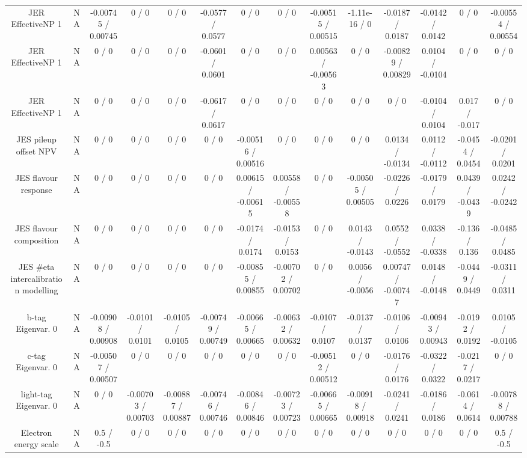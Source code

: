 \documentclass[10pt]{article}
\begin{document}
\begin{table}[htbp]
\begin{center}
\begin{tabular}{|c|c|c|c|c|c|c|c|c|c|c|c|c|c|}
  JER EffectiveNP 1 &    NA    & -0.00745 / 0.00745 & 0 / 0 & 0 / 0 & -0.0577 / 0.0577 & 0 / 0 & 0 / 0 & -0.00515 / 0.00515 & -1.11e-16 / 0 & -0.0187 / 0.0187 & -0.0142 / 0.0142 & 0 / 0 & -0.00554 / 0.00554 \\ 
  JER EffectiveNP 1 &    NA    & 0 / 0 & 0 / 0 & 0 / 0 & -0.0601 / 0.0601 & 0 / 0 & 0 / 0 & 0.00563 / -0.00563 & 0 / 0 & -0.00829 / 0.00829 & 0.0104 / -0.0104 & 0 / 0 & 0 / 0 \\ 
  JER EffectiveNP 1 &    NA    & 0 / 0 & 0 / 0 & 0 / 0 & -0.0617 / 0.0617 & 0 / 0 & 0 / 0 & 0 / 0 & 0 / 0 & 0 / 0 & -0.0104 / 0.0104 & 0.017 / -0.017 & 0 / 0 \\ 
  JES pileup offset NPV &    NA    & 0 / 0 & 0 / 0 & 0 / 0 & 0 / 0 & -0.00516 / 0.00516 & 0 / 0 & 0 / 0 & 0 / 0 & 0.0134 / -0.0134 & 0.0112 / -0.0112 & -0.0454 / 0.0454 & -0.0201 / 0.0201 \\ 
  JES flavour response &    NA    & 0 / 0 & 0 / 0 & 0 / 0 & 0 / 0 & 0.00615 / -0.00615 & 0.00558 / -0.00558 & 0 / 0 & -0.00505 / 0.00505 & -0.0226 / 0.0226 & -0.0179 / 0.0179 & 0.0439 / -0.0439 & 0.0242 / -0.0242 \\ 
  JES flavour composition &    NA    & 0 / 0 & 0 / 0 & 0 / 0 & 0 / 0 & -0.0174 / 0.0174 & -0.0153 / 0.0153 & 0 / 0 & 0.0143 / -0.0143 & 0.0552 / -0.0552 & 0.0338 / -0.0338 & -0.136 / 0.136 & -0.0485 / 0.0485 \\ 
  JES #eta intercalibration modelling &    NA    & 0 / 0 & 0 / 0 & 0 / 0 & 0 / 0 & -0.00855 / 0.00855 & -0.00702 / 0.00702 & 0 / 0 & 0.0056 / -0.0056 & 0.00747 / -0.00747 & 0.0148 / -0.0148 & -0.0449 / 0.0449 & -0.0311 / 0.0311 \\ 
  b-tag Eigenvar. 0 &    NA    & -0.00908 / 0.00908 & -0.0101 / 0.0101 & -0.0105 / 0.0105 & -0.00749 / 0.00749 & -0.00665 / 0.00665 & -0.00632 / 0.00632 & -0.0107 / 0.0107 & -0.0137 / 0.0137 & -0.0106 / 0.0106 & -0.00943 / 0.00943 & -0.0192 / 0.0192 & 0.0105 / -0.0105 \\ 
  c-tag Eigenvar. 0 &    NA    & -0.00507 / 0.00507 & 0 / 0 & 0 / 0 & 0 / 0 & 0 / 0 & 0 / 0 & -0.00512 / 0.00512 & 0 / 0 & -0.0176 / 0.0176 & -0.0322 / 0.0322 & -0.0217 / 0.0217 & 0 / 0 \\ 
  light-tag Eigenvar. 0 &    NA    & 0 / 0 & -0.00703 / 0.00703 & -0.00887 / 0.00887 & -0.00746 / 0.00746 & -0.00846 / 0.00846 & -0.00723 / 0.00723 & -0.00665 / 0.00665 & -0.00918 / 0.00918 & -0.0241 / 0.0241 & -0.0186 / 0.0186 & -0.0614 / 0.0614 & -0.00788 / 0.00788 \\ 
  Electron energy scale &    NA    & 0.5 / -0.5 & 0 / 0 & 0 / 0 & 0 / 0 & 0 / 0 & 0 / 0 & 0 / 0 & 0 / 0 & 0 / 0 & 0 / 0 & 0 / 0 & 0.5 / -0.5 \\ 

\end{tabular}
\end{center}
\end{table}
\end{document}
